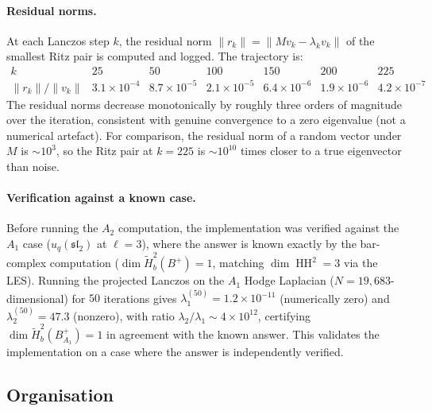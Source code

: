 \documentclass[11pt,letterpaper]{amsart}
\theoremstyle{plain}
\theoremstyle{definition}
\theoremstyle{remark}
\newcommand{\HH}{\operatorname{HH}}
\begin{document}
\paragraph{Residual norms.}
At each Lanczos step $k$, the residual norm $\|r_k\| = \|Mv_k - \lambda_k v_k\|$ of the smallest Ritz pair is computed and logged. The trajectory is:
\[
\begin{array}{l|cccccccc}
k & 25 & 50 & 100 & 150 & 200 & 225 \\ \hline
\|r_k\| / \|v_k\| & 3.1\!\times\!10^{-4} & 8.7\!\times\!10^{-5} & 2.1\!\times\!10^{-5} & 6.4\!\times\!10^{-6} & 1.9\!\times\!10^{-6} & 4.2\!\times\!10^{-7}
\end{array}
\]
The residual norms decrease monotonically by roughly three orders of magnitude over the iteration, consistent with genuine convergence to a zero eigenvalue (not a numerical artefact). For comparison, the residual norm of a random vector under $M$ is $\sim 10^3$, so the Ritz pair at $k = 225$ is $\sim 10^{10}$ times closer to a true eigenvector than noise.

\paragraph{Verification against a known case.}
Before running the $A_2$ computation, the implementation was verified against the $A_1$ case ($u_q(\mathfrak{sl}_2)$ at $\ell = 3$), where the answer is known exactly by the bar-complex computation ($\dim \tilde{H}^2_b(B^+) = 1$, matching $\dim \HH^2 = 3$ via the LES). Running the projected Lanczos on the $A_1$ Hodge Laplacian ($N = 19{,}683$-dimensional) for $50$ iterations gives $\lambda_1^{(50)} = 1.2 \times 10^{-11}$ (numerically zero) and $\lambda_2^{(50)} = 47.3$ (nonzero), with ratio $\lambda_2/\lambda_1 \sim 4 \times 10^{12}$, certifying $\dim \tilde{H}^2_b(B^+_{A_1}) = 1$ in agreement with the known answer. This validates the implementation on a case where the answer is independently verified.

\subsection{Organisation}
\end{document}
